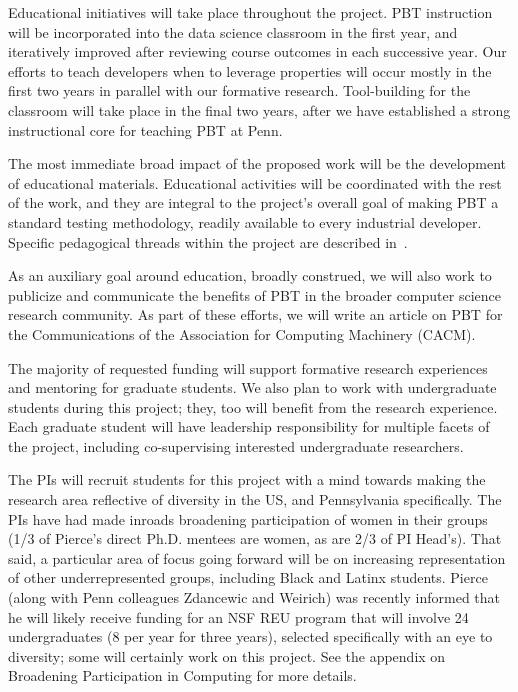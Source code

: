 Educational initiatives will take place throughout the project. PBT
instruction will be incorporated into the data science classroom in the
first year, and iteratively improved after reviewing course outcomes in each
successive year. Our efforts to teach developers when to leverage properties will
occur mostly in the first two years in parallel with our formative
research. Tool-building for the classroom will take place in the final two
years, after we have established a strong instructional core for teaching PBT at
Penn.


%
The most immediate broad impact of the proposed work will be the
development of educational materials. Educational activities will be
coordinated with the rest of the work, and they are integral to the
project's overall goal of making PBT a standard testing methodology,
readily available to every industrial developer.  Specific pedagogical
threads within the project are described in~.

As an auxiliary goal around education, broadly construed, we will also work to
publicize and communicate the benefits of PBT in the broader computer science
research community. As part of these efforts, we will write an article on PBT
for the Communications of the Association for Computing Machinery (CACM).

\smallskip
{}
%
The majority of requested funding will support formative research
experiences and mentoring for graduate students. We
also plan to work with undergraduate students during this project;
they, too will benefit from the research experience. Each graduate
student will have leadership responsibility for multiple facets of the
project, including co-supervising interested undergraduate
researchers.

The PIs will recruit students for this project with a mind towards making
the research area reflective of diversity in the US, and Pennsylvania specifically.
The PIs have had made inroads broadening participation of women in their
groups (1/3 of Pierce's direct Ph.D. mentees are women, as are 2/3 of PI
Head's). That said, a particular area of focus going forward will be on increasing representation of
other underrepresented groups, including Black and Latinx students. Pierce (along with Penn colleagues Zdancewic and Weirich)
was recently informed that he will likely receive funding for an
NSF REU program that will involve 24 undergraduates (8 per
year for three years), selected specifically with an eye to diversity;
some will certainly work on this project. See the appendix on Broadening Participation in Computing for more
details.


